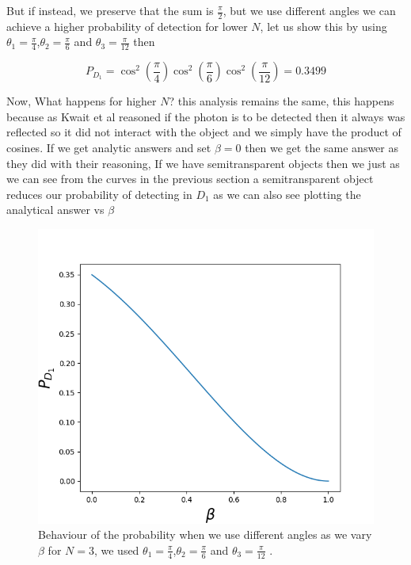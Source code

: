 \documentclass{book}
\begin{document}
But if instead, we preserve that the sum is $\frac{\pi}{2}$,  but we use different angles we can achieve a higher probability of detection for lower $N$, let us show this by using $\theta_{1}=\frac{\pi}{4}$,$\theta_{2}=\frac{\pi}{6}$ and $\theta_{3}=\frac{\pi}{12}$ then 

\begin{equation}
P_{D_{1}}=\cos^{2}{\left(\frac{\pi}{4} \right)} \cos^{2}{\left(\frac{\pi}{6} \right)} \cos^{2}{\left(\frac{\pi}{12} \right)}=0.3499
\end{equation}

Now, What happens for higher $N$? this analysis remains the same, this happens because as Kwait et al \cite{exp} reasoned if the photon is to be detected then it always was reflected so it did not interact with the object and we simply have the product of cosines. If we get analytic answers and set $\beta=0$ then we get the same answer as they did with their reasoning, If we have semitransparent objects then we just as we can see from the curves in the previous section a semitransparent object reduces our probability of detecting in $D_{1}$ as we can also see plotting the analytical answer vs $\beta$ 

\begin{figure}[!t]
\centering
\includegraphics[width=\linewidth]{images/alonso_idea.png}
\caption{Behaviour of the probability when we use different angles as we vary $\beta$ for $N=3$, we used $\theta_{1}=\frac{\pi}{4}$,$\theta_{2}=\frac{\pi}{6}$ and $\theta_{3}=\frac{\pi}{12}$ .}
\end{figure}
\end{document}
